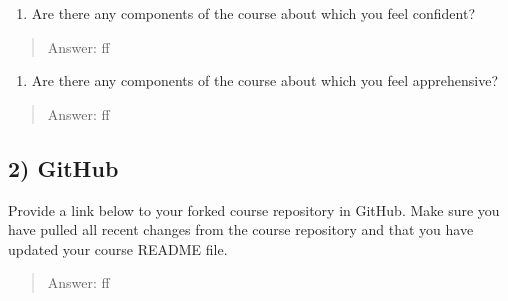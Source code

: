 \documentclass[
]{article}
\providecommand{\tightlist}{%
  \setlength{\itemsep}{0pt}\setlength{\parskip}{0pt}}
\begin{document}
\begin{enumerate}
\def\labelenumi{\arabic{enumi}.}
\setcounter{enumi}{1}
\tightlist
\item
  Are there any components of the course about which you feel confident?
\end{enumerate}

\begin{quote}
Answer: ff
\end{quote}

\begin{enumerate}
\def\labelenumi{\arabic{enumi}.}
\setcounter{enumi}{2}
\tightlist
\item
  Are there any components of the course about which you feel
  apprehensive?
\end{enumerate}

\begin{quote}
Answer: ff
\end{quote}

\hypertarget{github}{%
\subsection{2) GitHub}\label{github}}

Provide a link below to your forked course repository in GitHub. Make
sure you have pulled all recent changes from the course repository and
that you have updated your course README file.

\begin{quote}
Answer: ff
\end{quote}
\end{document}
